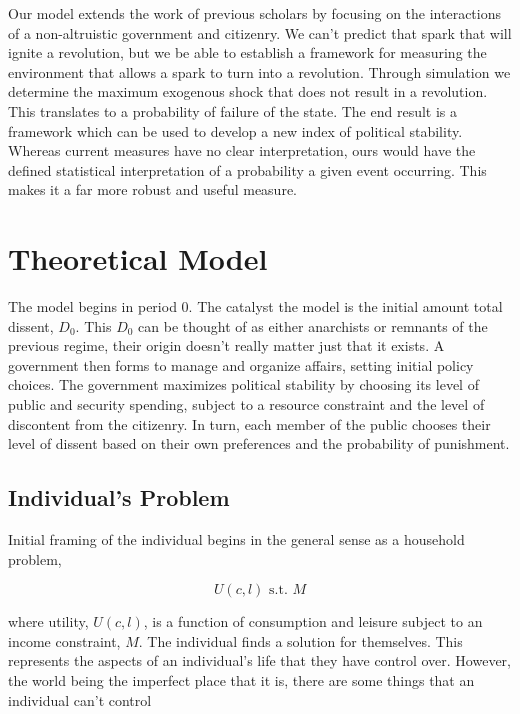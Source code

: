 \documentclass[12pt]{article}
\begin{document}
\begin{spacing}{1.5}
Our model extends the work of previous scholars by focusing on the interactions of a non-altruistic government and citizenry. We can't predict that spark that will ignite a revolution, but we be able to establish a framework for measuring the environment that allows a spark to turn into a revolution. Through simulation we determine the maximum exogenous shock that does not result in a revolution. This translates to a probability of failure of the state. The end result is a framework which can be used to develop a new index of political stability. Whereas current measures have no clear interpretation, ours would have the defined statistical interpretation of a probability a given event occurring. This makes it a far more robust and useful measure.    

\section{Theoretical Model}




The model begins in period 0. The catalyst the model is the initial amount total dissent, $D_0$. This $D_0$ can be thought of as either anarchists or remnants of the previous regime, their origin doesn't really matter just that it exists. A government then forms to manage and organize affairs, setting initial policy choices. The government maximizes political stability by choosing its level of public and security spending, subject to a resource constraint and the level of discontent from the citizenry. In turn, each member of the public chooses their level of dissent based on their own preferences and the probability of punishment.
 
\subsection{Individual's Problem}
Initial framing of the individual begins in the general sense as a household problem, 

\begin{equation}
	U(c,l) \text{ s.t. } M
\end{equation}

\noindent where utility, $U(c,l)$, is a function of consumption and leisure subject to an income constraint, $M$. The individual finds a solution for themselves. This represents the aspects of an individual's life that they have control over. However, the world being the imperfect place that it is, there are some things that an individual can't control  


\end{spacing}
\end{document}
